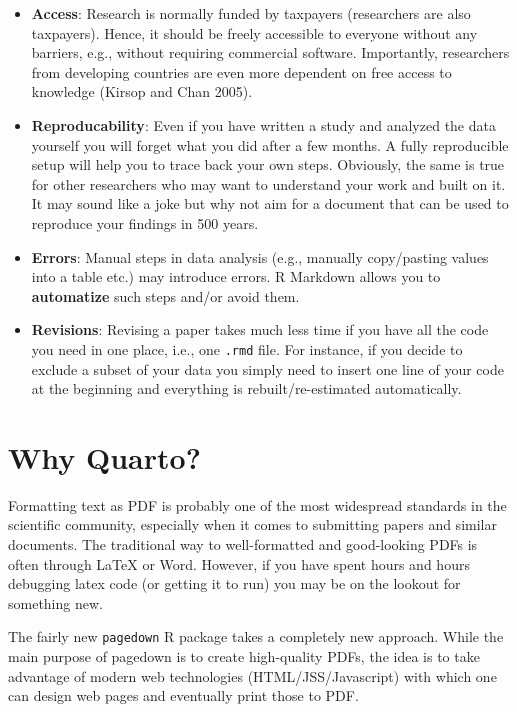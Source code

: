 \documentclass[
  letterpaper,
  DIV=11,
  numbers=noendperiod]{scrartcl}
\begin{document}
\begin{itemize}
\item
  \textbf{Access}: Research is normally funded by taxpayers (researchers
  are also taxpayers). Hence, it should be freely accessible to everyone
  without any barriers, e.g., without requiring commercial software.
  Importantly, researchers from developing countries are even more
  dependent on free access to knowledge (Kirsop and Chan 2005).
\item
  \textbf{Reproducability}: Even if you have written a study and
  analyzed the data yourself you will forget what you did after a few
  months. A fully reproducible setup will help you to trace back your
  own steps. Obviously, the same is true for other researchers who may
  want to understand your work and built on it. It may sound like a joke
  but why not aim for a document that can be used to reproduce your
  findings in 500 years.
\item
  \textbf{Errors}: Manual steps in data analysis (e.g., manually
  copy/pasting values into a table etc.) may introduce errors. R
  Markdown allows you to \textbf{automatize} such steps and/or avoid
  them.
\item
  \textbf{Revisions}: Revising a paper takes much less time if you have
  all the code you need in one place, i.e., one \texttt{.rmd} file. For
  instance, if you decide to exclude a subset of your data you simply
  need to insert one line of your code at the beginning and everything
  is rebuilt/re-estimated automatically.
\end{itemize}

\hypertarget{why-quarto}{%
\section{Why Quarto?}\label{why-quarto}}

Formatting text as PDF is probably one of the most widespread standards
in the scientific community, especially when it comes to submitting
papers and similar documents. The traditional way to well-formatted and
good-looking PDFs is often through LaTeX or Word. However, if you have
spent hours and hours debugging latex code (or getting it to run) you
may be on the lookout for something new.

The fairly new \texttt{pagedown} R package takes a completely new
approach. While the main purpose of pagedown is to create high-quality
PDFs, the idea is to take advantage of modern web technologies
(HTML/JSS/Javascript) with which one can design web pages and eventually
print those to PDF.
\end{document}
